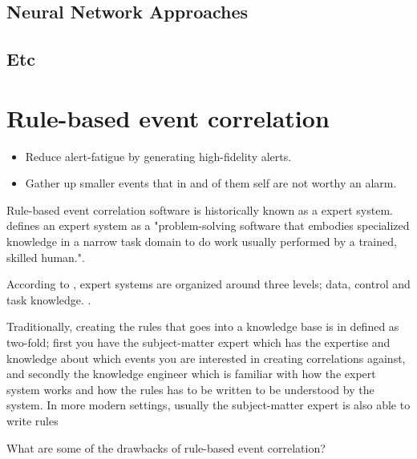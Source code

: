 \subsection{Neural Network Approaches}
\subsection{Etc}



\section{Rule-based event correlation}
\label{sec:eventcorrelation}

\begin{itemize}
    \item Reduce alert-fatigue by generating high-fidelity alerts.
    \item Gather up smaller events that in and of them self are not worthy an alarm.
\end{itemize}

Rule-based event correlation software is historically known as a expert system. \cite{cronk_1988} defines an expert system as a "problem-solving software that embodies specialized knowledge in a narrow task domain to do work usually performed by a trained, skilled human.".

According to \cite{cronk_1988}, expert systems are organized around three levels; data, control and task knowledge. .

Traditionally, creating the rules that goes into a knowledge base is in \cite{cronk_1988} defined as two-fold; first you have the subject-matter expert which has the expertise and knowledge about which events you are interested in creating correlations against, and secondly the knowledge engineer which is familiar with how the expert system works and how the rules has to be written to be understood by the system.
In more modern settings, usually the subject-matter expert is also able to write rules



What are some of the drawbacks of rule-based event correlation?

